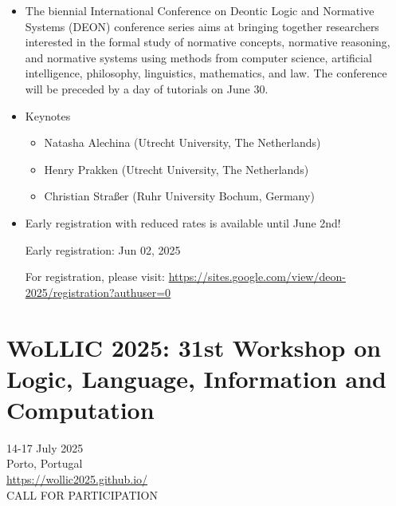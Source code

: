 \documentclass[prodmode,acmtecs]{acmsmall} %
\begin{document}
\begin{itemize}\item  The biennial International Conference on Deontic Logic and Normative Systems (DEON) conference series aims at bringing together researchers interested in the formal study of normative concepts, normative reasoning, and normative systems using methods from computer science, artificial intelligence, philosophy, linguistics, mathematics, and law. The conference will be preceded by a day of tutorials on June 30. 
 
\item  Keynotes 
 
\begin{itemize}\item  Natasha Alechina (Utrecht University, The Netherlands)
\item  Henry Prakken (Utrecht University, The Netherlands)
\item  Christian Straßer (Ruhr University Bochum, Germany)
\end{itemize} 
\item  Early registration with reduced rates is available until June 2nd! 
 
Early registration: Jun 02, 2025 
 
  For registration, please visit: \href{https://sites.google.com/view/deon-2025/registration?authuser=0}{https://sites.google.com/view/deon-2025/registration?authuser=0} 
 
\end{itemize}\section{WoLLIC 2025: 31st Workshop on Logic, Language, Information and Computation}\label{WoLLIC2025}  14-17 July 2025\\ 
  Porto, Portugal\\ 
  \href{https://wollic2025.github.io/}{https://wollic2025.github.io/}\\ 
CALL FOR PARTICIPATION 
\end{document}
